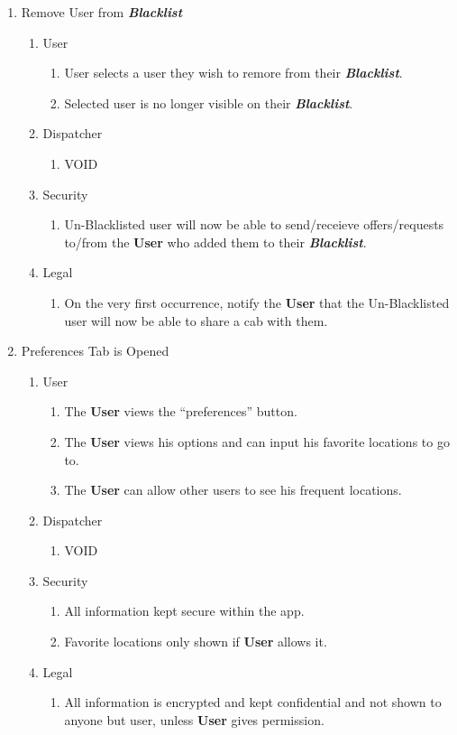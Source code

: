 \documentclass[english]{article}
\begin{document}
\begin{enumerate}[{BE}1.]
	\item Remove User from \textbf{\emph{Blacklist}}
	\begin{enumerate}[{VP11}.1]
		\item User
			\begin{enumerate}
				\item User selects a user they wish to remore from their \textbf{\emph{Blacklist}}.
				\item Selected user is no longer visible on their \textbf{\emph{Blacklist}}.
			\end{enumerate}
		\item Dispatcher
			\begin{enumerate}
				\item VOID
			\end{enumerate}
		\item Security
			\begin{enumerate}
				\item Un-Blacklisted user will now be able to send/receieve offers/requests to/from the \textbf{User} who added them to their \textbf{\emph{Blacklist}}.
			\end{enumerate}
		\item Legal
			\begin{enumerate}
				\item On the very first occurrence, notify the \textbf{User} that the Un-Blacklisted user will now be able to share a cab with them.
			\end{enumerate}
	\end{enumerate}
	
	\item Preferences Tab is Opened
	\begin{enumerate}[{VP12}.1]
		\item User
		\begin{enumerate}
			\item The \textbf{User} views the “preferences” button.
			\item The \textbf{User} views his options and can input his favorite locations to go to.
			\item The \textbf{User} can allow other users to see his frequent locations.
		\end{enumerate}
		\item Dispatcher
		\begin{enumerate}
			\item VOID
		\end{enumerate}
		\item Security
		\begin{enumerate}
			\item All information kept secure within the app.
			\item Favorite locations only shown if \textbf{User} allows it.
		\end{enumerate}
		\item Legal
		\begin{enumerate}
			\item All information is encrypted and kept confidential and not shown to anyone but user, unless \textbf{User} gives permission.
		\end{enumerate}
	\end{enumerate}
	

\end{enumerate}
\end{document}

